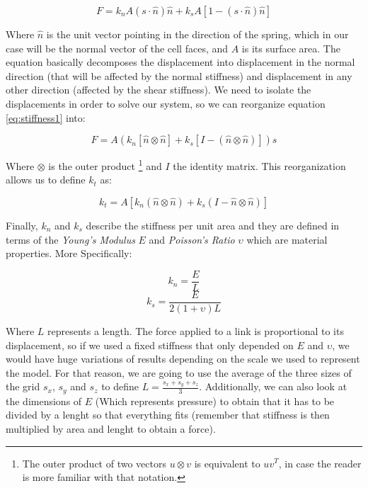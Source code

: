 \begin{equation}\label{eq:stiffness1}
    F = k_nA(s\cdot \hat{n})\hat{n} + k_sA[1 - (s\cdot \hat{n})\hat{n}]
\end{equation}

Where $\hat{n}$ is the unit vector pointing in the direction of the spring, 
which in our case will be the normal vector of the cell faces, and 
$A$ is its surface area. The equation basically decomposes the displacement into displacement in the normal direction 
(that will be affected by the normal stiffness) and displacement in any other 
direction (affected by the shear stiffness). We need to isolate the 
displacements in order to solve our system, so we can reorganize equation \ref{eq:stiffness1}
into:

\begin{equation}
    F = A(k_n[\hat{n} \otimes \hat{n}] + k_s[I - (\hat{n} \otimes \hat{n})])s 
\end{equation}

Where $\otimes$ is the outer product \footnote{The outer product of two 
vectors $u \otimes v$ is equivalent to $uv^T$, in case the reader is more familiar with that notation.} 
and $I$ the identity matrix. This reorganization allows us to define $k_t$ 
as:

\begin{equation}
    k_t = A[k_n(\hat{n} \otimes \hat{n}) + k_s(I - \hat{n} \otimes \hat{n})]
\end{equation}

Finally, $k_n$ and $k_s$ describe the stiffness per unit area and they are 
defined in terms of the \textit{Young's Modulus} $E$ and \textit{Poisson's Ratio} $\upsilon$
which are material properties. More Specifically:

\begin{equation}
    k_n = \frac{E}{L}
\end{equation}
\begin{equation}
    k_s = \frac{E}{2(1 + \upsilon)L}
\end{equation}

Where $L$ represents a length. The force applied to a link is proportional 
to its displacement, so if we used a fixed stiffness that only depended 
on $E$ and $\upsilon$, we would have huge variations of results depending 
on the scale we used to represent the model. For that reason, we are going 
to use the average of the three sizes of the grid $s_x$, $s_y$ and $s_z$
to define $L = \frac{s_x + s_y + s_z}{3}$. Additionally, we can also 
look at the dimensions of $E$ (Which represents pressure) to obtain that 
it has to be divided by a lenght so that everything fits (remember 
that stiffness is then multiplied by area and lenght to obtain a force). 
